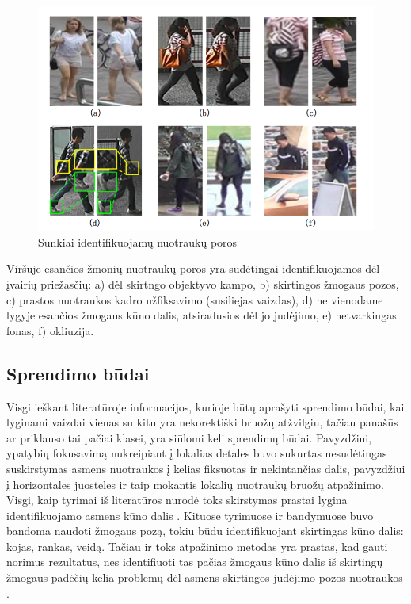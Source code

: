 \documentclass{VUMIFPSkursinis}
\begin{document}
\begin{figure}[H]
\centering
\includegraphics[scale=1.0]{img/image_diff_examples.png}
\caption{Sunkiai identifikuojamų nuotraukų poros} %
\label{img:mlp}
\end{figure}
Viršuje esančios žmonių nuotraukų poros yra sudėtingai identifikuojamos dėl įvairių priežasčių: a) dėl skirtngo objektyvo kampo, b) skirtingos žmogaus pozos, c) prastos nuotraukos kadro užfiksavimo (susiliejas vaizdas), d) ne vienodame lygyje esančios žmogaus kūno dalis, atsiradusios dėl jo judėjimo, e) netvarkingas fonas, f) okliuzija.

\pagebreak
\subsection{Sprendimo būdai}
Visgi ieškant literatūroje informacijos, kurioje būtų aprašyti sprendimo būdai, kai lyginami vaizdai vienas su kitu yra nekorektiški bruožų atžvilgiu, tačiau panašūs ar priklauso tai pačiai klasei, yra siūlomi keli sprendimų būdai. Pavyzdžiui, ypatybių fokusavimą nukreipiant į lokalias detales buvo sukurtas nesudėtingas suskirstymas asmens nuotraukos į kelias fiksuotas ir nekintančias dalis, pavyzdžiui į horizontales juosteles ir taip mokantis lokalių nuotraukų bruožų atpažinimo. Visgi, kaip tyrimai iš literatūros nurodė toks skirstymas prastai lygina identifikuojamo asmens kūno dalis \cite{Person_reindentification}. Kituose tyrimuose ir bandymuose buvo bandoma naudoti žmogaus pozą, tokiu būdu identifikuojant skirtingas kūno dalis: kojas, rankas, veidą. Tačiau ir toks atpažinimo metodas yra prastas, kad gauti norimus rezultatus, nes identifiuoti tas pačias žmogaus kūno dalis iš skirtingų žmogaus padėčių kelia problemų dėl asmens skirtingos judėjimo pozos nuotraukos \cite{Person_reindentification}.
\pagebreak
\end{document}
